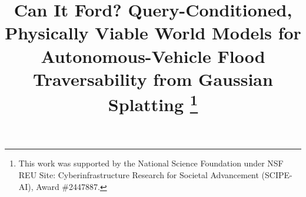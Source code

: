 \documentclass[conference]{IEEEtran}
\begin{document}
\title{Can It Ford? Query-Conditioned, Physically Viable World Models for\\
Autonomous-Vehicle Flood Traversability from Gaussian Splatting
\thanks{This work was supported by the National Science Foundation under NSF REU Site: Cyberinfrastructure Research for Societal Advancement (SCIPE-AI), Award \#2447887.}}

\author{
}

\maketitle
\end{document}
